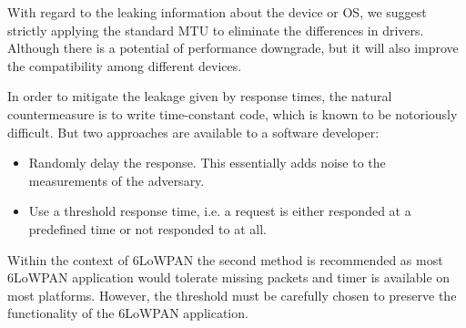 \documentclass{article}
\begin{document}
With regard to the leaking information about the device or OS, we suggest strictly applying the standard MTU to eliminate the differences in drivers. Although there is a potential of performance downgrade, but it will also improve the compatibility among different devices.


In order to mitigate the leakage given by response times, the natural countermeasure is to write time-constant code, which is known to be notoriously difficult. But two approaches are available to a software developer:
\begin{itemize}
	\item Randomly delay the response. This essentially adds noise to the measurements of the adversary.
	 
	\item Use a threshold response time, i.e. a request is either responded at a predefined time or not responded to at all. 
\end{itemize}
Within the context of 6LoWPAN the second method is recommended as most 6LoWPAN application would tolerate missing packets and timer is available on most platforms. However, the threshold must be carefully chosen to preserve the functionality of the 6LoWPAN application.





\appendix










%
%
\end{document}
